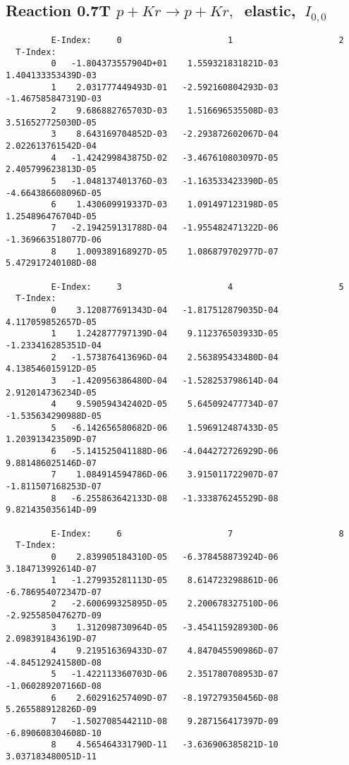 \documentclass[12pt,dvipdfmx]{article}
\begin{document}
\subsection{
Reaction 0.7T  $p + Kr \rightarrow p + Kr ,\ $
 elastic, $\  I_{0,0}$
}

\begin{small}\begin{verbatim}
         E-Index:     0                     1                     2
  T-Index:
         0   -1.804373557904D+01    1.559321831821D-03    1.404133353439D-03
         1    2.031777449493D-01   -2.592160804293D-03   -1.467585847319D-03
         2    9.686882765703D-03    1.516696535508D-03    3.516527725030D-05
         3    8.643169704852D-03   -2.293872602067D-04    2.022613761542D-04
         4   -1.424299843875D-02   -3.467610803097D-05    2.405799623813D-05
         5   -1.048137401376D-03   -1.163533423390D-05   -4.664386608096D-05
         6    1.430609919337D-03    1.091497123198D-05    1.254896476704D-05
         7   -2.194259131788D-04   -1.955482471322D-06   -1.369663518077D-06
         8    1.009389168927D-05    1.086879702977D-07    5.472917240108D-08

         E-Index:     3                     4                     5
  T-Index:
         0    3.120877691343D-04   -1.817512879035D-04    4.117059852657D-05
         1    1.242877797139D-04    9.112376503933D-05   -1.233416285351D-04
         2   -1.573876413696D-04    2.563895433480D-04    4.138546015912D-05
         3   -1.420956386480D-04   -1.528253798614D-04    2.912014736234D-05
         4    9.590594342402D-05    5.645092477734D-07   -1.535634290988D-05
         5   -6.142656580682D-06    1.596912487433D-05    1.203913423509D-07
         6   -5.141525041188D-06   -4.044272726929D-06    9.881486025146D-07
         7    1.084914594786D-06    3.915011722907D-07   -1.811507168253D-07
         8   -6.255863642133D-08   -1.333876245529D-08    9.821435035614D-09

         E-Index:     6                     7                     8
  T-Index:
         0    2.839905184310D-05   -6.378458873924D-06    3.184713992614D-07
         1   -1.279935281113D-05    8.614723298861D-06   -6.786954072347D-07
         2   -2.600699325895D-05    2.200678327510D-06   -2.925585047627D-09
         3    1.312098730964D-05   -3.454115928930D-06    2.098391843619D-07
         4    9.219516369433D-07    4.847045590986D-07   -4.845129241580D-08
         5   -1.422113360703D-06    2.351780708953D-07   -1.060289207166D-08
         6    2.602916257409D-07   -8.197279350456D-08    5.265588912826D-09
         7   -1.502708544211D-08    9.287156417397D-09   -6.890608304608D-10
         8    4.565464331790D-11   -3.636906385821D-10    3.037183480051D-11
\end{verbatim}\end{small}
\end{document}
